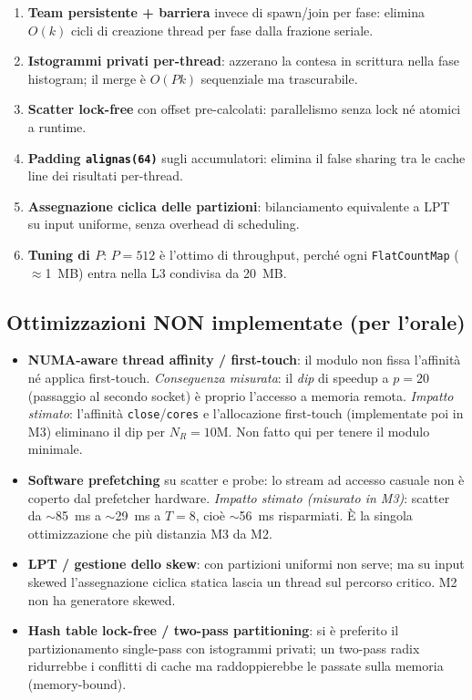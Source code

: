 \documentclass[11pt,a4paper]{article}
\theoremstyle{remark}
\begin{document}
\begin{enumerate}
  \item \textbf{Team persistente + barriera} invece di spawn/join per fase: elimina $O(k)$ cicli di creazione thread per fase dalla frazione seriale.
  \item \textbf{Istogrammi privati per-thread}: azzerano la contesa in scrittura nella fase histogram; il merge \`e $O(Pk)$ sequenziale ma trascurabile.
  \item \textbf{Scatter lock-free} con offset pre-calcolati: parallelismo senza lock n\'e atomici a runtime.
  \item \textbf{Padding \texttt{alignas(64)}} sugli accumulatori: elimina il false sharing tra le cache line dei risultati per-thread.
  \item \textbf{Assegnazione ciclica delle partizioni}: bilanciamento equivalente a LPT su input uniforme, senza overhead di scheduling.
  \item \textbf{Tuning di $P$}: $P=512$ \`e l'ottimo di throughput, perch\'e ogni \texttt{FlatCountMap} ($\approx$1~MB) entra nella L3 condivisa da 20~MB.
\end{enumerate}

\subsection{Ottimizzazioni NON implementate (per l'orale)}

\begin{itemize}
  \item \textbf{NUMA-aware thread affinity / first-touch}: il modulo non fissa l'affinit\`a n\'e applica first-touch. \emph{Conseguenza misurata}: il \emph{dip} di speedup a $p=20$ (passaggio al secondo socket) \`e proprio l'accesso a memoria remota. \emph{Impatto stimato}: l'affinit\`a \texttt{close}/\texttt{cores} e l'allocazione first-touch (implementate poi in M3) eliminano il dip per $N_R=10$M. Non fatto qui per tenere il modulo minimale.
  \item \textbf{Software prefetching} su scatter e probe: lo stream ad accesso casuale non \`e coperto dal prefetcher hardware. \emph{Impatto stimato (misurato in M3)}: scatter da $\sim$85~ms a $\sim$29~ms a $T=8$, cio\`e $\sim$56~ms risparmiati. \`E la singola ottimizzazione che pi\`u distanzia M3 da M2.
  \item \textbf{LPT / gestione dello skew}: con partizioni uniformi non serve; ma su input skewed l'assegnazione ciclica statica lascia un thread sul percorso critico. M2 non ha generatore skewed.
  \item \textbf{Hash table lock-free / two-pass partitioning}: si \`e preferito il partizionamento single-pass con istogrammi privati; un two-pass radix ridurrebbe i conflitti di cache ma raddoppierebbe le passate sulla memoria (memory-bound).
\end{itemize}
\end{document}
